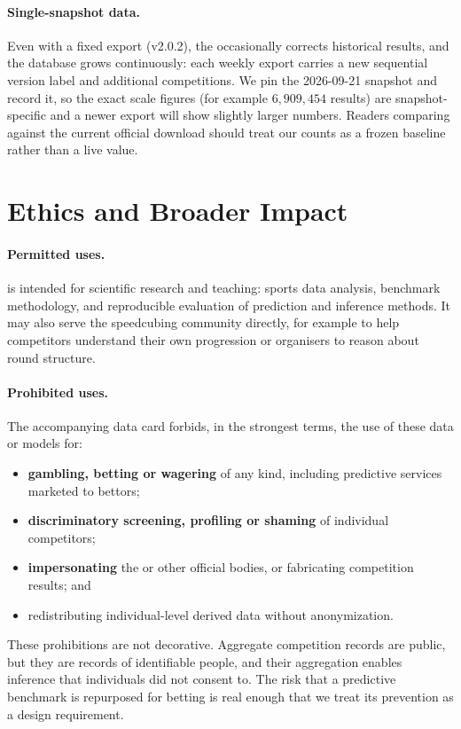 \paragraph{Single-snapshot data.} Even with a fixed export (v2.0.2), the \wca{}
occasionally corrects historical results, and the database grows continuously:
each weekly export carries a new sequential version label and additional
competitions. We pin the 2026-09-21 snapshot and record it, so the exact scale
figures (for example $6{,}909{,}454$ results) are snapshot-specific and a newer
export will show slightly larger numbers. Readers comparing against the current
official download should treat our counts as a frozen baseline rather than a
live value.

\section{Ethics and Broader Impact}
\label{sec:ethics}

\paragraph{Permitted uses.} \wcabench{} is intended for scientific research and
teaching: sports data analysis, benchmark methodology, and reproducible
evaluation of prediction and inference methods. It may also serve the
speedcubing community directly, for example to help competitors understand
their own progression or organisers to reason about round structure.

\paragraph{Prohibited uses.} The accompanying data card forbids, in the
strongest terms, the use of these data or models for:
\begin{itemize}
  \item \textbf{gambling, betting or wagering} of any kind, including
        predictive services marketed to bettors;
  \item \textbf{discriminatory screening, profiling or shaming} of individual
        competitors;
  \item \textbf{impersonating} the \wca{} or other official bodies, or
        fabricating competition results; and
  \item redistributing individual-level derived data without anonymization.
\end{itemize}
These prohibitions are not decorative. Aggregate competition records are
public, but they are records of identifiable people, and their aggregation
enables inference that individuals did not consent to. The risk that a
predictive benchmark is repurposed for betting is real enough that we treat its
prevention as a design requirement.

